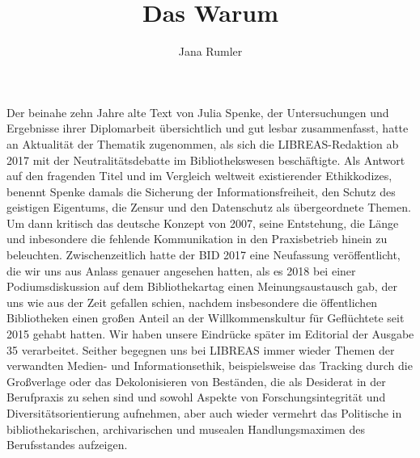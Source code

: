 \documentclass[output=paper]{langsci/langscibook}
\title{Das Warum}
\author{Jana Rumler}
\begin{document}
\maketitle

\noindent Der beinahe zehn Jahre alte Text von Julia Spenke, der Untersuchungen und Ergebnisse ihrer Diplomarbeit übersichtlich und gut lesbar zusammenfasst, hatte an Aktualität der Thematik zugenommen, als sich die LIBREAS-Redaktion ab 2017 mit der Neutralitätsdebatte im Bibliothekswesen beschäftigte. Als Antwort auf den fragenden Titel und im Vergleich weltweit existierender Ethikkodizes, benennt Spenke damals die Sicherung der Informationsfreiheit, den Schutz des geistigen Eigentums, die Zensur und den Datenschutz als übergeordnete Themen. Um dann kritisch das deutsche Konzept von 2007, seine Entstehung, die Länge und inbesondere die fehlende Kommunikation in den Praxisbetrieb hinein zu beleuchten. Zwischenzeitlich hatte der BID 2017 eine Neufassung veröffentlicht, die wir uns aus Anlass genauer angesehen hatten, als es 2018 bei einer Podiumsdiskussion auf dem Bibliothekartag einen Meinungsaustausch gab, der uns wie aus der Zeit gefallen schien, nachdem insbesondere die öffentlichen Bibliotheken einen großen Anteil an der Willkommenskultur für Geflüchtete seit 2015 gehabt hatten. Wir haben unsere Eindrücke später im Editorial der Ausgabe 35 verarbeitet. Seither begegnen uns bei LIBREAS immer wieder Themen der verwandten Medien- und Informationsethik, beispielsweise das Tracking durch die Großverlage oder das Dekolonisieren von Beständen, die als Desiderat in der Berufpraxis zu sehen sind und sowohl Aspekte von Forschungsintegrität und Diversitätsorientierung aufnehmen, aber auch wieder vermehrt das Politische in bibliothekarischen, archivarischen und musealen Handlungsmaximen des Berufsstandes aufzeigen.   
\end{document}
